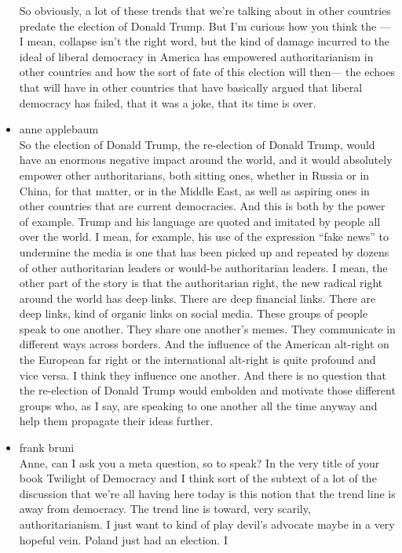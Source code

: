 \begin{itemize}
  So obviously, a lot of these trends that we're talking about in other
  countries predate the election of Donald Trump. But I'm curious how
  you think the --- I mean, collapse isn't the right word, but the kind
  of damage incurred to the ideal of liberal democracy in America has
  empowered authoritarianism in other countries and how the sort of fate
  of this election will then--- the echoes that will have in other
  countries that have basically argued that liberal democracy has
  failed, that it was a joke, that its time is over.
\item
  anne applebaum\\
  So the election of Donald Trump, the re-election of Donald Trump,
  would have an enormous negative impact around the world, and it would
  absolutely empower other authoritarians, both sitting ones, whether in
  Russia or in China, for that matter, or in the Middle East, as well as
  aspiring ones in other countries that are current democracies. And
  this is both by the power of example. Trump and his language are
  quoted and imitated by people all over the world. I mean, for example,
  his use of the expression ``fake news'' to undermine the media is one
  that has been picked up and repeated by dozens of other authoritarian
  leaders or would-be authoritarian leaders. I mean, the other part of
  the story is that the authoritarian right, the new radical right
  around the world has deep links. There are deep financial links. There
  are deep links, kind of organic links on social media. These groups of
  people speak to one another. They share one another's memes. They
  communicate in different ways across borders. And the influence of the
  American alt-right on the European far right or the international
  alt-right is quite profound and vice versa. I think they influence one
  another. And there is no question that the re-election of Donald Trump
  would embolden and motivate those different groups who, as I say, are
  speaking to one another all the time anyway and help them propagate
  their ideas further.
\item
  frank bruni\\
  Anne, can I ask you a meta question, so to speak? In the very title of
  your book Twilight of Democracy and I think sort of the subtext of a
  lot of the discussion that we're all having here today is this notion
  that the trend line is away from democracy. The trend line is toward,
  very scarily, authoritarianism. I just want to kind of play devil's
  advocate maybe in a very hopeful vein. Poland just had an election. I

\end{itemize}
